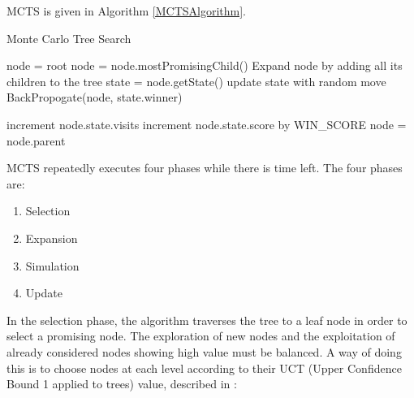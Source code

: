 MCTS is given in Algorithm \ref{MCTSAlgorithm}.











\begin{algorithm}
    \caption{Monte Carlo Tree Search}
    \label{MCTSAlgorithm}
    \begin{algorithmic}
        \State node = root
        \State node = node.mostPromisingChild()
        \EndWhile
        \State Expand node by adding all its children to the tree
        \State state = node.getState()
        \State update state with random move
        \EndWhile
        \State BackPropogate(node, state.winner)
        \EndWhile
        
        \EndProcedure
        
        \State increment node.state.visits 
        \State increment node.state.score by WIN\_SCORE
        \EndIf
        \State node = node.parent
        \EndWhile
        \EndProcedure
        
        
    \end{algorithmic}
    
\end{algorithm}




MCTS repeatedly executes four phases while there is time left. The four phases are:

\begin{enumerate}
    \item Selection
    \item Expansion
    \item Simulation
    \item Update
\end{enumerate}

In the selection phase, the algorithm traverses the tree to a leaf node in order to select a promising node. The exploration of new nodes and the exploitation of already considered nodes showing high value must be balanced. A way of doing this is to choose nodes at each level according to their UCT (Upper Confidence Bound 1 applied to trees) value, described in \cite{UCT2}:

